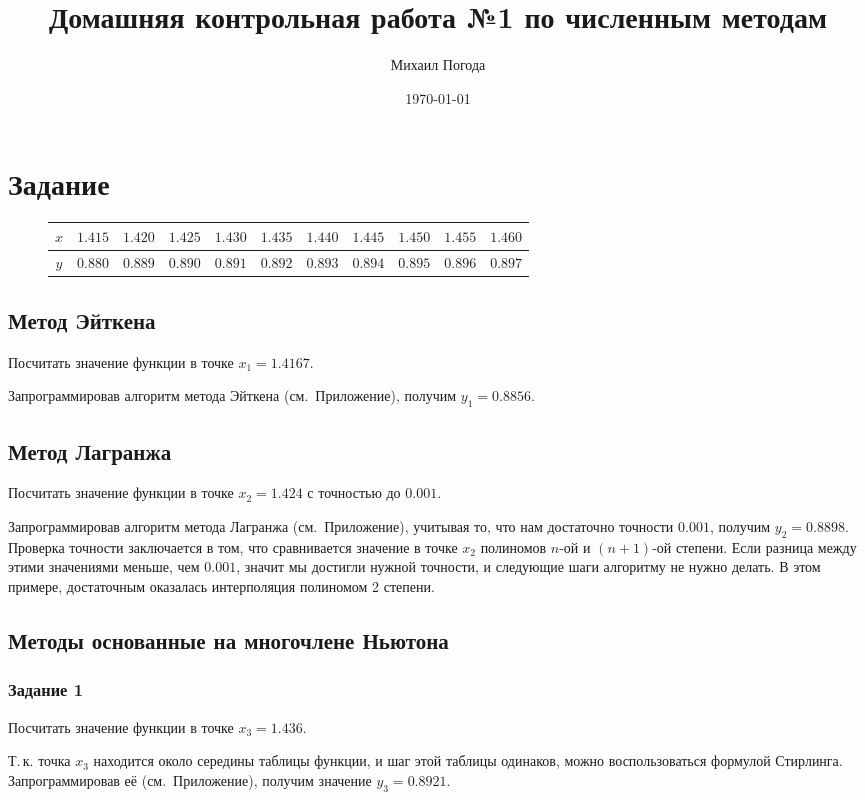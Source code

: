 \documentclass[a4paper,10pt,notitlepage,pdftex,headsepline]{scrartcl}
\author{Михаил Погода}
\title{Домашняя контрольная работа №1 по численным методам}
\date{\today}
\begin{document}
\maketitle

\section{Задание}
\begin{figure}[hc]
\begin{tabular}{c|c|c|c|c|c|c|c|c|c|c|}
$x$ & $1.415$ & $1.420$ & $1.425$ & $1.430$ & $1.435$ & $1.440$ & $1.445$ & $1.450$ & $1.455$ & $1.460$\\
\hline
$y$ & $0.880$ & $0.889$ & $0.890$ & $0.891$ & $0.892$ & $0.893$ & $0.894$ & $0.895$ & $0.896$ & $0.897$
\end{tabular}
\end{figure}
\subsection{Метод Эйткена}
Посчитать значение функции в точке $x_1 = 1.4167$.

Запрограммировав алгоритм метода Эйткена (см.~Приложение), получим $y_1 = 0.8856$.
\subsection{Метод Лагранжа}
Посчитать значение функции в точке $x_2 = 1.424$ с точностью до $0.001$.

Запрограммировав алгоритм метода Лагранжа (см.~Приложение), учитывая то, что нам достаточно точности $0.001$, получим $y_2 = 0.8898$.
Проверка точности заключается в том, что сравнивается значение в точке $x_2$ полиномов $n$-ой и $(n+1)$-ой степени. Если разница между этими значениями меньше, чем $0.001$, значит мы достигли нужной точности, и следующие шаги алгоритму не нужно делать. В этом примере, достаточным оказалась интерполяция полиномом 2 степени.
\subsection{Методы основанные на многочлене Ньютона}
\subsubsection{Задание 1}
Посчитать значение функции в точке $x_3 = 1.436$.

Т.\,к. точка $x_3$ находится около середины таблицы функции, и шаг этой таблицы одинаков, можно воспользоваться формулой Стирлинга. Запрограммировав её (см.~Приложение), получим значение $y_3 = 0.8921$.
\end{document}
